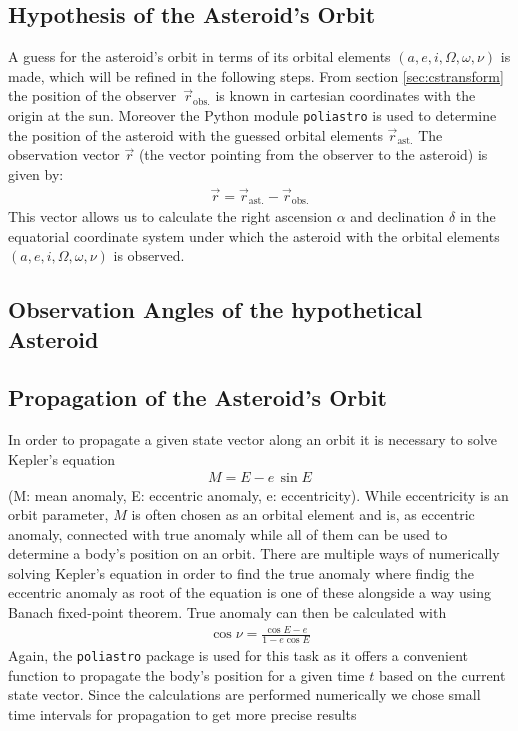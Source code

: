 \documentclass[11pt, a4paper]{article}
\numberwithin{equation}{section}
\begin{document}
\subsection{Hypothesis of the Asteroid's Orbit}
\label{sec:hypothesis}
A guess for the asteroid's orbit in terms of its orbital elements $(a, e, i, \Omega, \omega, \nu)$ is made, which will be refined in the following steps.
From section \ref{sec:cstransform} the position of the observer~$\vec{r}_\mathrm{obs.}$ is known in cartesian coordinates with the origin at the sun.
Moreover the Python module \texttt{poliastro} is used to determine the position of the asteroid with the guessed orbital elements $\vec{r}_\mathrm{ast.}$
The observation vector $\vec{r}$ (the vector pointing from the observer to the asteroid) is given by:
\begin{align}
	\vec{r} = \vec{r}_\mathrm{ast.} - \vec{r}_\mathrm{obs.}
\end{align}
This vector allows us to calculate the right ascension $\alpha$ and declination $\delta$ in the equatorial coordinate system under which the asteroid with the orbital elements $(a, e, i, \Omega, \omega, \nu)$ is observed.

\subsection{Observation Angles of the hypothetical Asteroid}

\subsection{Propagation of the Asteroid's Orbit}
In order to propagate  a given state vector along an orbit it is necessary to solve Kepler's equation
\begin{align}
	M = E - e\, \sin E
\end{align}
(M: mean anomaly, E: eccentric anomaly, e: eccentricity).
While eccentricity is an orbit parameter, $M$ is often chosen as an orbital element and is, as eccentric anomaly, connected with true anomaly while all of them can be used to determine a body's position on an orbit.
There are multiple ways of numerically solving Kepler's equation in order to find the true anomaly where findig the eccentric anomaly as root of the equation is one of these alongside a way using Banach fixed-point theorem.
True anomaly can then be calculated with
\begin{align}
\cos\nu = \frac{\cos E - e}{1 - e \cos E}
\end{align}
Again, the \texttt{poliastro} package is used for this task as it offers a convenient function to propagate the body's position for a given time $t$ based on the current state vector.
Since the calculations are performed numerically we chose small time intervals for propagation to get more precise results
\end{document}

